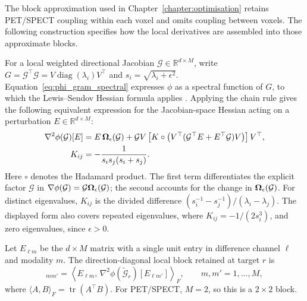 The block approximation used in Chapter~\ref{chapter:optimisation} retains PET/SPECT coupling within each voxel and omits coupling between voxels. The following construction specifies how the local derivatives are assembled into those approximate blocks.

For a local weighted directional Jacobian $\mathcal{G}\in\mathbb{R}^{d\times M}$, write $G=\mathcal{G}^\top \mathcal{G}=V\operatorname{diag}(\lambda_i)V^\top$ and $s_i=\sqrt{\lambda_i+\epsilon^2}$. Equation~\eqref{eq:phi_gram_spectral} expresses $\phi$ as a spectral function of $G$, to which the Lewis--Sendov Hessian formula applies \cite[Theorem~3.3]{doi:10.1137/S089547980036838X}. Applying the chain rule gives the following equivalent expression for the Jacobian-space Hessian acting on a perturbation $E\in\mathbb{R}^{d\times M}$:
\begin{equation}
    \begin{aligned}
    \nabla^2\phi(\mathcal{G})[E]
    &=E\,\bm{\Omega}_{\epsilon}\!\left(\mathcal{G}\right)
    +\mathcal{G}V\left[K\circ\left(V^\top(\mathcal{G}^\top E+E^\top \mathcal{G})V\right)\right]V^\top,\\
    K_{ij}&=-\frac{1}{s_i s_j(s_i+s_j)}.
    \end{aligned}
    \label{eq:ls_local_hessian_action}
\end{equation}
Here $\circ$ denotes the Hadamard product. The first term differentiates the explicit factor $\mathcal{G}$ in $\nabla\phi(\mathcal{G})=\mathcal{G}\bm{\Omega}_{\epsilon}\!\left(\mathcal{G}\right)$; the second accounts for the change in $\bm{\Omega}_{\epsilon}\!\left(\mathcal{G}\right)$. For distinct eigenvalues, $K_{ij}$ is the divided difference $(s_i^{-1}-s_j^{-1})/(\lambda_i-\lambda_j)$. The displayed form also covers repeated eigenvalues, where $K_{ij}=-1/(2s_i^3)$, and zero eigenvalues, since $\epsilon>0$.

Let $E_{\ell m}$ be the $d\times M$ matrix with a single unit entry in difference channel $\ell$ and modality $m$. The direction-diagonal local block retained at target $r$ is
\begin{equation}
    [\Theta_{r,\ell}]_{mm'}
    =\left\langle E_{\ell m},\,
    \nabla^2\phi(\tilde{\mathcal G}_r)[E_{\ell m'}]\right\rangle_F,
    \qquad m,m'=1,\ldots,M,
    \label{eq:ls_local_direction_block}
\end{equation}
where $\langle A,B\rangle_F=\operatorname{tr}(A^\top B)$. For PET/SPECT, $M=2$, so this is a $2\times2$ block.

